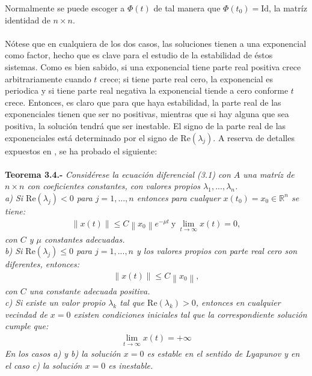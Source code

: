 Normalmente se puede escoger a $\Phi(t)$ de tal manera que $\Phi(t_{0})=\textrm{Id}$, la matríz identidad de $n\times n$.
\\
\\
Nótese que en cualquiera de los dos casos, las soluciones tienen a una exponencial como factor, hecho que es clave para el estudio de la estabilidad de éstos sistemas. Como es bien sabido, si una exponencial tiene parte real positiva crece arbitrariamente cuando $t$ crece; si tiene parte real cero, la exponencial es periodica y si tiene parte real negativa la exponencial tiende a cero conforme $t$ crece. Entonces, es claro que para que haya estabilidad, la parte real de las exponenciales tienen que ser no positivas, mientras que si hay alguna que sea positiva, la solución tendrá que ser inestable. El signo de la parte real de las exponenciales está determinado por el signo de $\mbox{Re}(\lambda_{j})$. A reserva de detalles expuestos en \citep{ver}, se ha probado el siguiente:
\\
\\
\textbf{Teorema 3.4.-} \textit{Considérese la ecuación diferencial (3.1) con $A$ una matríz de $n\times n$ con coeficientes constantes, con valores propios $\lambda_{1},...,\lambda_{n}$.}
\\
\textit{a) Si $\mbox{Re}(\lambda_{j})<0$ para $j=1,...,n$ entonces para cualquer $x(t_{0})=x_{0}\in \mathbb{R}^{n}$ se tiene:}
\begin{eqnarray*}
\left \| x(t) \right \| \leq C \left \| x_{0} \right \| e^{-\mu t} \ \mbox{y} \ \displaystyle\lim_{t \to \infty}{ x(t)} = 0,
\end{eqnarray*}
\textit{con $C$ y $\mu$ constantes adecuadas.}
\\
\textit{b) Si $\mbox{Re}(\lambda_{j})\leq 0$ para $j=1,...,n$ y los valores propios con parte real cero son diferentes, entonces:}
\begin{eqnarray*}
\left \| x(t) \right \| \leq C \left \| x_{0} \right \|,
\end{eqnarray*}
\textit{con $C$ una constante adecuada positiva.}
\\
\textit{c) Si existe un valor propio $\lambda_{k}$ tal que $\mbox{Re}(\lambda_{k}) > 0$, entonces en cualquier vecindad de $x=0$ existen condiciones iniciales tal que la correspondiente solución cumple que:}
\begin{eqnarray*}
\displaystyle\lim_{t \to \infty}{ x(t)} = +\infty
\end{eqnarray*}
\textit{En los casos a) y b) la solución $x=0$ es estable en el sentido de Lyapunov y en el caso c) la solución $x=0$ es inestable.}
